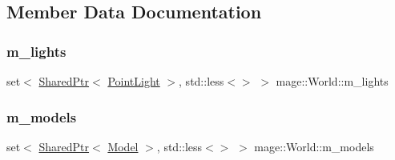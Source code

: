 \subsection{Member Data Documentation}
\hypertarget{classmage_1_1_world_acb9bceb4598a9d572f026cb65d850de5}{}\label{classmage_1_1_world_acb9bceb4598a9d572f026cb65d850de5} 
\subsubsection{\texorpdfstring{m\+\_\+lights}{m\_lights}}
{\footnotesize\ttfamily set$<$ \hyperlink{namespacemage_a1e01ae66713838a7a67d30e44c67703e}{Shared\+Ptr}$<$ \hyperlink{structmage_1_1_point_light}{Point\+Light} $>$, std\+::less$<$$>$ $>$ mage\+::\+World\+::m\+\_\+lights\hspace{0.3cm}{\ttfamily [private]}}

\hypertarget{classmage_1_1_world_ad2c8da43f7cc24ec9f3108d24ff3c144}{}\label{classmage_1_1_world_ad2c8da43f7cc24ec9f3108d24ff3c144} 
\subsubsection{\texorpdfstring{m\+\_\+models}{m\_models}}
{\footnotesize\ttfamily set$<$ \hyperlink{namespacemage_a1e01ae66713838a7a67d30e44c67703e}{Shared\+Ptr}$<$ \hyperlink{classmage_1_1_model}{Model} $>$, std\+::less$<$$>$ $>$ mage\+::\+World\+::m\+\_\+models\hspace{0.3cm}{\ttfamily [private]}}

